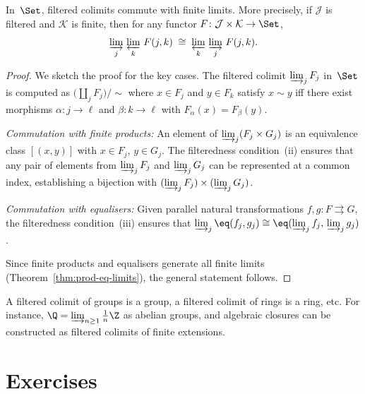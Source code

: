 \begin{theorem}\label{thm:filtered-colim-set}
In~$\Set$, filtered colimits commute with finite limits.
More precisely, if $\mathcal{J}$ is filtered and $\mathcal{K}$ is finite,
then for any functor $F\colon\mathcal{J}\times\mathcal{K}\to\Set$,
\[
    \varinjlim_j\, \varprojlim_k\, F(j,k)
    \;\cong\;
    \varprojlim_k\, \varinjlim_j\, F(j,k).
\]
\end{theorem}

\begin{proof}
We sketch the proof for the key cases.  The filtered colimit
$\varinjlim_j F_j$ in~$\Set$ is computed as
$\bigl(\coprod_j F_j\bigr)/{\sim}$
where $x\in F_j$ and $y\in F_k$ satisfy $x\sim y$ iff there exist
morphisms $\alpha\colon j\to\ell$ and $\beta\colon k\to\ell$ with
$F_\alpha(x) = F_\beta(y)$.

\smallskip\noindent
\emph{Commutation with finite products:}
An element of $\varinjlim_j(F_j\times G_j)$ is an equivalence class
$[(x,y)]$ with $x\in F_j$, $y\in G_j$.  The filteredness condition~(ii)
ensures that any pair of elements from
$\varinjlim_j F_j$ and $\varinjlim_j G_j$ can be represented at a
common index, establishing a bijection with
$(\varinjlim_j F_j)\times(\varinjlim_j G_j)$.

\smallskip\noindent
\emph{Commutation with equalisers:}
Given parallel natural transformations $f,g\colon F\rightrightarrows G$,
the filteredness condition~(iii) ensures that
$\varinjlim_j\eq(f_j,g_j) \cong \eq(\varinjlim_j f_j,\,\varinjlim_j g_j)$.

Since finite products and equalisers generate all finite limits
(Theorem~\ref{thm:prod-eq-limits}), the general statement follows.
\end{proof}

\begin{example}\label{ex:filtered-colim-algebra}
A filtered colimit of groups is a group, a filtered colimit of rings
is a ring, etc.  For instance, $\Q = \varinjlim_{n\geq 1} \frac{1}{n}\Z$
as abelian groups, and algebraic closures can be constructed as
filtered colimits of finite extensions.
\end{example}


\section{Exercises}\label{sec:exercises-ch3}

